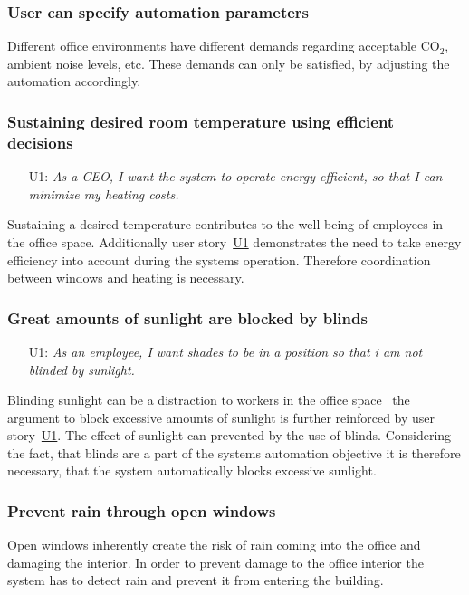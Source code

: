 \documentclass[runningheads]{llncs}
\begin{document}
\subsubsection{User can specify automation parameters}
Different office environments have different demands regarding acceptable CO$_2$, ambient noise levels, etc. These demands can only be satisfied, by adjusting the automation accordingly.

\subsubsection{Sustaining desired room temperature using efficient decisions}
\begin{itemize}
    \item [U1:] \label{r4u1} \textit{As a CEO, I want the system to operate energy efficient, so that I can minimize my heating costs.}
\end{itemize}
Sustaining a desired temperature contributes to the well-being of employees in the office space. Additionally user story~\hyperref[r4u1]{U1} demonstrates the need to take energy efficiency into account during the systems operation.
Therefore coordination between windows and heating is necessary.

\subsubsection{Great amounts of sunlight are blocked by blinds}
\begin{itemize}
    \item [U1:] \label{r5u1} \textit{As an employee, I want shades to be in a position so that i am not blinded by sunlight.}
\end{itemize}
Blinding sunlight can be a distraction to workers in the office space~\cite{indoor_noiselight} the argument to block excessive amounts of sunlight is further reinforced by user story~\hyperref[r5u1]{U1}. The effect of sunlight can prevented by the use of blinds. Considering the fact, that blinds are a part of the systems automation objective it is therefore necessary, that the system automatically blocks excessive sunlight.

\subsubsection{Prevent rain through open windows}
Open windows inherently create the risk of rain coming into the office and damaging the interior. In order to prevent damage to the office interior the system has to detect rain and prevent it from entering the building.
\end{document}
